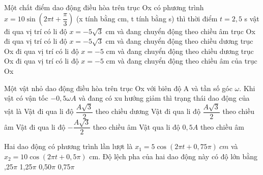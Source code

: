 \begin{ex}%
Một chất điểm dao động điều hòa trên trục Ox có phương trình $x=10\sin \left(2\pi t+\dfrac{\pi}{3}\right)$ (x tính bằng cm, t tính bằng s) thì thời điểm $t = 2,5$ s vật
\choice
{\True đi qua vị trí có li độ $x=-5\sqrt{3}$ cm và đang chuyển động theo chiều âm trục Ox}
{đi qua vị trí có li độ $x=-5\sqrt{3}$ cm và đang chuyển động theo chiều dương trục Ox}
{đi qua vị trí có li độ $x = - 5$ cm và đang chuyển động theo chiều dương trục Ox}
{đi qua vị trí có li độ $x = - 5$ cm và đang chuyển động theo chiều âm của trục Ox}
\end{ex} 
\begin{ex}%
Một vật nhỏ dao động điều hòa trên trục Ox với biên độ A và tần số góc $\omega$. Khi vật có vận tốc $-0,5\omega A$ và đang có xu hướng giảm thì trạng thái dao động của vật là
\choice
{Vật đi qua li độ  $\dfrac{A\sqrt{3}}{2}$ theo chiều dương}
{\True Vật đi qua li độ  $\dfrac{A\sqrt{3}}{2}$ theo chiều âm}
{Vật đi qua li độ  $-\dfrac{A\sqrt{3}}{2}$ theo chiều âm}
{Vật qua li độ $0,5A$ theo chiều âm}
\end{ex} 
\begin{ex}%
 Hai dao động có phương trình lần lượt là $x_1 = 5\cos \left(2\pi t+0,75\pi\right)\ cm$ và $x_2=10\cos \left(2\pi t+0,5\pi\right)$ cm. Độ lệch pha của hai dao động này có độ lớn bằng
\choice
{,25$\pi $}
{1,25$\pi $}
{0,50$\pi $}
{0,75$\pi $}
\end{ex} 
